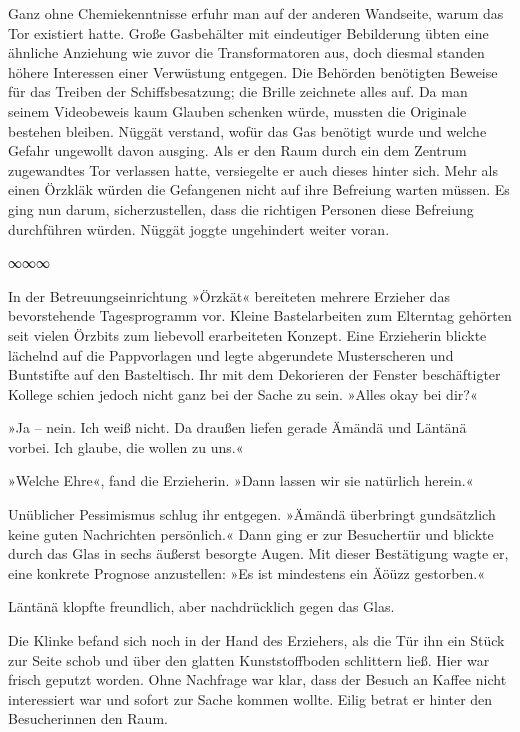 Ganz ohne Chemiekenntnisse erfuhr man auf der anderen Wandseite, warum das Tor existiert hatte. Große Gasbehälter mit eindeutiger Bebilderung übten eine ähnliche Anziehung wie zuvor die Transformatoren aus, doch diesmal standen höhere Interessen einer Verwüstung entgegen. Die Behörden benötigten Beweise für das Treiben der Schiffsbesatzung; die Brille zeichnete alles auf. Da man seinem Videobeweis kaum Glauben schenken würde, mussten die Originale bestehen bleiben. Nüggät verstand, wofür das Gas benötigt wurde und welche Gefahr ungewollt davon ausging. Als er den Raum durch ein dem Zentrum zugewandtes Tor verlassen hatte, versiegelte er auch dieses hinter sich. Mehr als einen Örzkläk würden die Gefangenen nicht auf ihre Befreiung warten müssen. Es ging nun darum, sicherzustellen, dass die richtigen Personen diese Befreiung durchführen würden. Nüggät joggte ungehindert weiter voran.

\begin{center}
	∞∞∞
\end{center}

In der Betreuungseinrichtung »Örzkät« bereiteten mehrere Erzieher das bevorstehende Tagesprogramm vor. Kleine Bastelarbeiten zum Elterntag gehörten seit vielen Örzbits zum liebevoll erarbeiteten Konzept. Eine Erzieherin blickte lächelnd auf die Pappvorlagen und legte abgerundete Musterscheren und Buntstifte auf den Basteltisch. Ihr mit dem Dekorieren der Fenster beschäftigter Kollege schien jedoch nicht ganz bei der Sache zu sein. »Alles okay bei dir?«

»Ja – nein. Ich weiß nicht. Da draußen liefen gerade Ämändä und Läntänä vorbei. Ich glaube, die wollen zu uns.«

»Welche Ehre«, fand die Erzieherin. »Dann lassen wir sie natürlich herein.«

Unüblicher Pessimismus schlug ihr entgegen. »Ämändä überbringt gundsätzlich keine guten Nachrichten persönlich.« Dann ging er zur Besuchertür und blickte durch das Glas in sechs äußerst besorgte Augen. Mit dieser Bestätigung wagte er, eine konkrete Prognose anzustellen: »Es ist mindestens ein Äöüzz gestorben.«

Läntänä klopfte freundlich, aber nachdrücklich gegen das Glas. 

Die Klinke befand sich noch in der Hand des Erziehers, als die Tür ihn ein Stück zur Seite schob und über den glatten Kunststoffboden schlittern ließ. Hier war frisch geputzt worden. Ohne Nachfrage war klar, dass der Besuch an Kaffee nicht interessiert war und sofort zur Sache kommen wollte. Eilig betrat er hinter den Besucherinnen den Raum.

